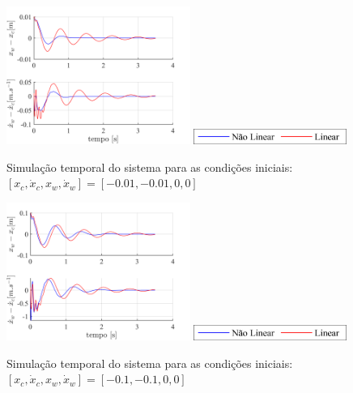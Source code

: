 \documentclass[a4paper]{ifacconf}
\begin{document}
    \FloatBarrier
    \begin{figure}[htbp]
        \begin{centering}
            \includegraphics[width=6cm]{img/sim_temp_xc_n001_dxc_n001.png}
            \includegraphics[width=5cm]{img/sim_temp_Leg.png}
            \caption{Simulação temporal do sistema para as condições iniciais:  $[x_c, \dot{x}_c, x_w, \dot{x}_w]=[-0.01,-0.01,0,0]$}
            \label{fig:sim_temp_xc_n01_dxc_n01}
        \end{centering}
    \end{figure}
    \FloatBarrier
    
    \FloatBarrier
    \begin{figure}[htbp]
        \begin{centering}
            \includegraphics[width=6cm]{img/sim_temp_xc_n01_dxc_n01.png}
            \includegraphics[width=5cm]{img/sim_temp_Leg.png}
            \caption{Simulação temporal do sistema para as condições iniciais:  $[x_c, \dot{x}_c, x_w, \dot{x}_w]=[-0.1,-0.1,0,0]$}
            \label{fig:sim_temp_xc_n01_dxc_n01}
        \end{centering}
    \end{figure}
    \FloatBarrier
    
\end{document}
